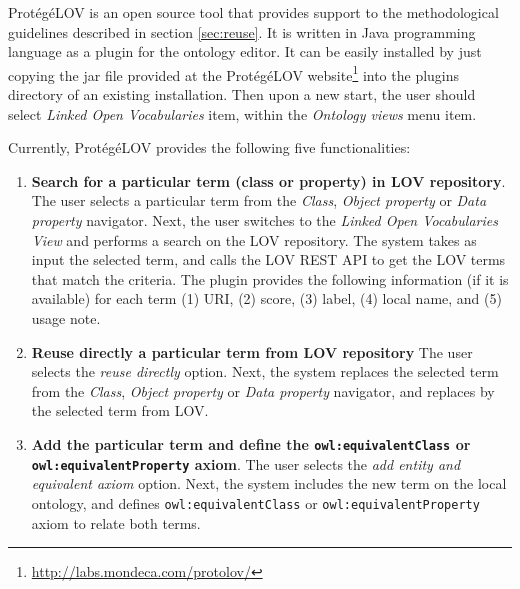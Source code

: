 Prot{\'e}g{\'e}LOV is an open source tool that provides support to the methodological guidelines described in section \ref{sec:reuse}. It is written in Java programming language as a plugin for the \protege ontology editor. It can be easily installed by just copying the jar file provided at the Prot{\'e}g{\'e}LOV website\footnote{\url{http://labs.mondeca.com/protolov/}} into the plugins directory of an existing \protege installation. Then upon a new start, the user should select \emph{Linked Open Vocabularies} item, within the \emph{Ontology views} menu item.

Currently, Prot{\'e}g{\'e}LOV provides the following five functionalities: 

\begin{enumerate}
\vspace{-1mm}\item \textbf{Search for a particular term (class or property) in LOV repository}. 
The user selects a particular term from the \emph{Class}, \emph{Object property} or \emph{Data property} navigator. 
Next, the user switches to the \emph{Linked Open Vocabularies View} and performs a search on the LOV repository. The system takes as input the selected term, and calls the LOV REST API to get the LOV terms that match the criteria.
The plugin provides the following information (if it is available) for each term (1) URI, (2) score, (3) label, (4) local name, and (5) usage note.


\vspace{-1mm}\item \textbf{Reuse directly a particular term from LOV repository}
The user selects the \emph{reuse directly} option. Next, the system replaces the selected term from the \emph{Class}, \emph{Object property} or \emph{Data property} navigator, and replaces by the selected term from LOV.

\vspace{-1mm}\item \textbf{Add the particular term and define the {\tt owl:equivalentClass} or {\tt owl:equivalentProperty} axiom}.
The user selects the \emph{add entity and equivalent axiom} option. Next, the system includes the new term on the local ontology, and defines {\tt owl:equivalentClass} or {\tt owl:equivalentProperty} axiom to relate both terms.


\end{enumerate}
